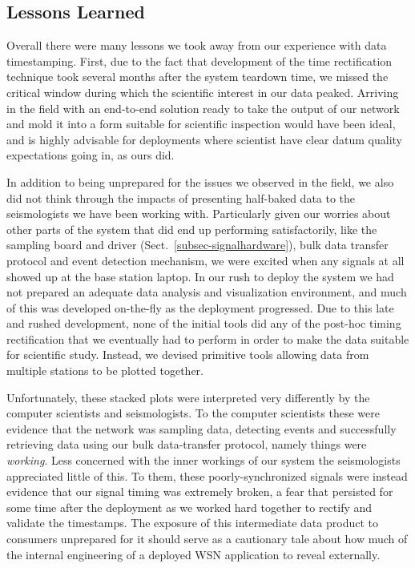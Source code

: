 \subsection{Lessons Learned}

Overall there were many lessons we took away from our experience with data
timestamping.  First, due to the fact that development of the time
rectification technique took several months after the system teardown time,
we missed the critical window during which the scientific interest in our
data peaked.  Arriving in the field with an end-to-end solution ready to take
the output of our network and mold it into a form suitable for scientific
inspection would have been ideal, and is highly advisable for deployments
where scientist have clear datum quality expectations going in, as ours did.  

In addition to being unprepared for the issues we observed in the field, we
also did not think through the impacts of presenting half-baked data to the
seismologists we have been working with.  Particularly given our worries
about other parts of the system that did end up performing satisfactorily,
like the sampling board and driver (Sect.~\ref{subsec-signalhardware}), bulk
data transfer protocol and event detection mechanism, we were excited when
any signals at all showed up at the base station laptop. In our rush to
deploy the system we had not prepared an adequate data analysis and
visualization environment, and much of this was developed on-the-fly as the
deployment progressed. Due to this late and rushed development, none of the
initial tools did any of the post-hoc timing rectification that we eventually
had to perform in order to make the data suitable for scientific study.
Instead, we devised primitive tools allowing data from multiple stations to
be plotted together.

Unfortunately, these stacked plots were interpreted very differently
by the computer scientists and seismologists. To the computer scientists
these were evidence that the network was sampling data, detecting events and
successfully retrieving data using our bulk data-transfer protocol, namely
things were \textit{working}. Less concerned with the inner workings of our
system the seismologists appreciated little of this.  To them, these
poorly-synchronized signals were instead evidence that our signal timing was
extremely broken, a fear that persisted for some time after the deployment as
we worked hard together to rectify and validate the timestamps.  
The exposure of this intermediate data product to consumers unprepared for it
should serve as a cautionary tale about how much of the internal engineering
of a deployed WSN application to reveal externally.

